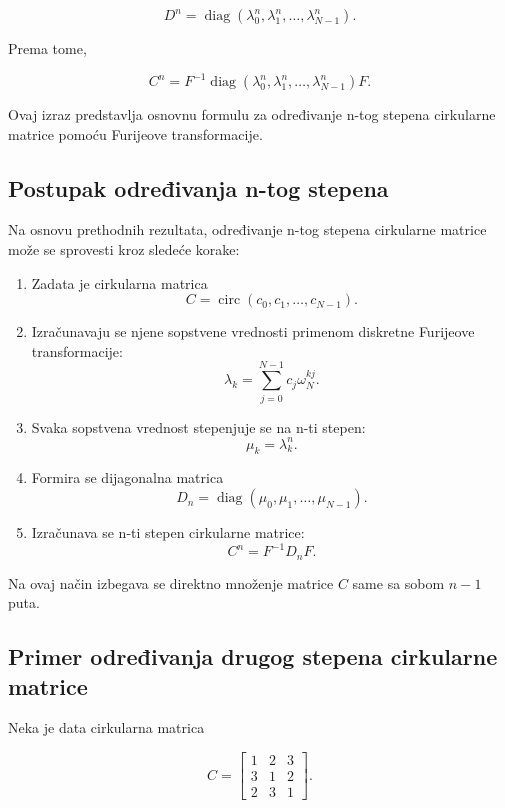 \documentclass[12pt,a4paper]{report}
\begin{document}
\[
D^n=
\operatorname{diag}(\lambda_0^n,\lambda_1^n,\dots,\lambda_{N-1}^n).
\]

Prema tome,

\[
\boxed{
	C^n=
	F^{-1}
	\operatorname{diag}(\lambda_0^n,\lambda_1^n,\dots,\lambda_{N-1}^n)
	F
}.
\]

Ovaj izraz predstavlja osnovnu formulu za određivanje n-tog stepena cirkularne matrice pomoću Furijeove transformacije.

\subsection{Postupak određivanja n-tog stepena}

Na osnovu prethodnih rezultata, određivanje n-tog stepena cirkularne matrice može se sprovesti kroz sledeće korake:

\begin{enumerate}
	\item Zadata je cirkularna matrica
	\[
	C=\operatorname{circ}(c_0,c_1,\dots,c_{N-1}).
	\]
	
	\item Izračunavaju se njene sopstvene vrednosti primenom diskretne Furijeove transformacije:
	\[
	\lambda_k=\sum_{j=0}^{N-1}c_j\omega_N^{kj}.
	\]
	
	\item Svaka sopstvena vrednost stepenjuje se na n-ti stepen:
	\[
	\mu_k=\lambda_k^n.
	\]
	
	\item Formira se dijagonalna matrica
	\[
	D_n=\operatorname{diag}(\mu_0,\mu_1,\dots,\mu_{N-1}).
	\]
	
	\item Izračunava se n-ti stepen cirkularne matrice:
	\[
	\boxed{C^n=F^{-1}D_nF}.
	\]
\end{enumerate}

Na ovaj način izbegava se direktno množenje matrice \(C\) same sa sobom \(n-1\) puta.

\subsection{Primer određivanja drugog stepena cirkularne matrice}

Neka je data cirkularna matrica

\[
C=
\begin{bmatrix}
	1 & 2 & 3\\
	3 & 1 & 2\\
	2 & 3 & 1
\end{bmatrix}.
\]
\end{document}
